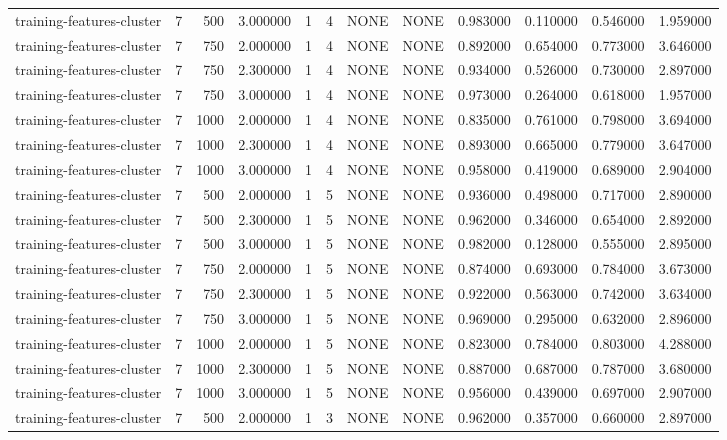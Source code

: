 \begin{tabular}{lrrrllllrrrr}
training-features-cluster & 7 & 500 & 3.000000 & 1 & 4 & NONE & NONE & 0.983000 & 0.110000 & 0.546000 & 1.959000 \\
training-features-cluster & 7 & 750 & 2.000000 & 1 & 4 & NONE & NONE & 0.892000 & 0.654000 & 0.773000 & 3.646000 \\
training-features-cluster & 7 & 750 & 2.300000 & 1 & 4 & NONE & NONE & 0.934000 & 0.526000 & 0.730000 & 2.897000 \\
training-features-cluster & 7 & 750 & 3.000000 & 1 & 4 & NONE & NONE & 0.973000 & 0.264000 & 0.618000 & 1.957000 \\
training-features-cluster & 7 & 1000 & 2.000000 & 1 & 4 & NONE & NONE & 0.835000 & 0.761000 & 0.798000 & 3.694000 \\
training-features-cluster & 7 & 1000 & 2.300000 & 1 & 4 & NONE & NONE & 0.893000 & 0.665000 & 0.779000 & 3.647000 \\
training-features-cluster & 7 & 1000 & 3.000000 & 1 & 4 & NONE & NONE & 0.958000 & 0.419000 & 0.689000 & 2.904000 \\
training-features-cluster & 7 & 500 & 2.000000 & 1 & 5 & NONE & NONE & 0.936000 & 0.498000 & 0.717000 & 2.890000 \\
training-features-cluster & 7 & 500 & 2.300000 & 1 & 5 & NONE & NONE & 0.962000 & 0.346000 & 0.654000 & 2.892000 \\
training-features-cluster & 7 & 500 & 3.000000 & 1 & 5 & NONE & NONE & 0.982000 & 0.128000 & 0.555000 & 2.895000 \\
training-features-cluster & 7 & 750 & 2.000000 & 1 & 5 & NONE & NONE & 0.874000 & 0.693000 & 0.784000 & 3.673000 \\
training-features-cluster & 7 & 750 & 2.300000 & 1 & 5 & NONE & NONE & 0.922000 & 0.563000 & 0.742000 & 3.634000 \\
training-features-cluster & 7 & 750 & 3.000000 & 1 & 5 & NONE & NONE & 0.969000 & 0.295000 & 0.632000 & 2.896000 \\
training-features-cluster & 7 & 1000 & 2.000000 & 1 & 5 & NONE & NONE & 0.823000 & 0.784000 & 0.803000 & 4.288000 \\
training-features-cluster & 7 & 1000 & 2.300000 & 1 & 5 & NONE & NONE & 0.887000 & 0.687000 & 0.787000 & 3.680000 \\
training-features-cluster & 7 & 1000 & 3.000000 & 1 & 5 & NONE & NONE & 0.956000 & 0.439000 & 0.697000 & 2.907000 \\
training-features-cluster & 7 & 500 & 2.000000 & 1 & 3 & NONE & NONE & 0.962000 & 0.357000 & 0.660000 & 2.897000 \\

\end{tabular}
